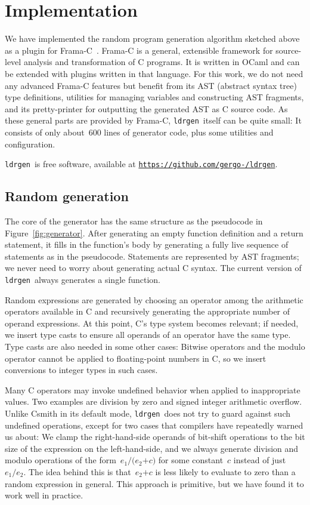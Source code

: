 \documentclass{llncs}
\newcommand\ldrgen{\texttt{ldrgen}}
\begin{document}
\section{Implementation}

We have implemented the random program generation algorithm sketched above
as a plugin for Frama-C~\cite{frama-c}. Frama-C is a general, extensible
framework for source-level analysis and transformation of C programs. It is
written in OCaml and can be extended with plugins written in that language.
For this work, we do not need any advanced Frama-C features but benefit from
its AST (abstract syntax tree) type definitions, utilities for managing
variables and constructing AST fragments, and its pretty-printer for
outputting the generated AST as C source code. As these general parts are
provided by Frama-C, \ldrgen\ itself can be quite small: It consists of only
about~600 lines of generator code, plus some utilities and configuration.

\ldrgen\ is free software, available at
\texttt{\url{https://github.com/gergo-/ldrgen}}.

\subsection{Random generation}

The core of the generator has the same structure as the pseudocode in
Figure~\ref{fig:generator}. After generating an empty function definition
and a return statement, it fills in the function's body by generating a
fully live sequence of statements as in the pseudocode. Statements are
represented by AST fragments; we never need to worry about generating actual
C syntax. The current version of \ldrgen\ always generates a single
function.

Random expressions are generated by choosing an operator among the
arithmetic operators available in C and recursively generating the
appropriate number of operand expressions. At this point, C's type system
becomes relevant; if needed, we insert type casts to ensure all operands of
an operator have the same type. Type casts are also needed in some other
cases: Bitwise operators and the modulo operator cannot be applied to
floating-point numbers in C, so we insert conversions to integer types in
such cases.

Many C operators may invoke undefined behavior when applied to inappropriate
values. Two examples are division by zero and signed integer arithmetic
overflow. Unlike Csmith in its default mode, \ldrgen\ does not try to guard
against such undefined operations, except for two cases that compilers have
repeatedly warned us about: We clamp the right-hand-side operands of
bit-shift operations to the bit size of the expression on the
left-hand-side, and we always generate division and modulo operations of the
form~\(e_1 \mathtt{/} \mathtt{(}e_2 \mathtt{+} c\mathtt{)}\) for some
constant~\(c\) instead of just~\(e_1 \mathtt{/} e_2\). The idea behind this
is that~\(e_2 \mathtt{+} c\) is less likely to evaluate to zero than a
random expression in general. This approach is primitive, but we have found
it to work well in practice.
\end{document}
